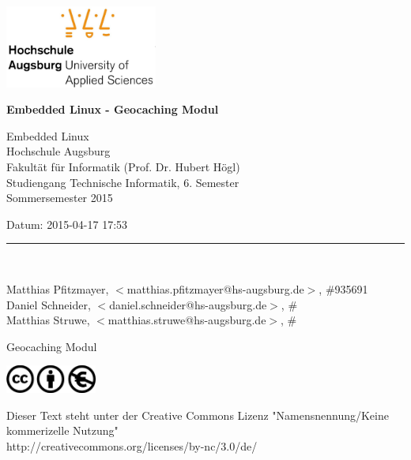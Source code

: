 




















\ \ 
\hfill
\begin{minipage}[t]{5cm}
\includegraphics[width=5cm]{img/hsa-logo.jpg}
\end{minipage}

\vskip 10mm

{\parindent=0pt

\thispagestyle{empty}


{\Large\bf Embedded Linux - Geocaching Modul
}

\vskip 5mm

Embedded Linux \\
Hochschule Augsburg \\
Fakultät für Informatik (Prof. Dr. Hubert Högl) \\
Studiengang Technische Informatik, 6. Semester \\

Sommersemester 2015
 

Datum: 2015-04-17 17:53 \\

\medskip

\rule{10cm}{4pt}\\

\medskip

Matthias Pfitzmayer, $<$matthias.pfitzmayer@hs-augsburg.de$>$, \#935691 \\
Daniel Schneider, $<$daniel.schneider@hs-augsburg.de$>$, \# \\
Matthias Struwe, $<$matthias.struwe@hs-augsburg.de$>$, \# \\


\vskip 2cm

\begin{center}
{\LARGE\bf

Geocaching Modul

}
\end{center}

\vfill

\begin{minipage}[t]{3cm}
\includegraphics[width=3cm]{img/cc-logo.jpg}
\end{minipage}

{\small
Dieser Text steht unter der Creative Commons Lizenz "Namensnennung/Keine kommerizelle Nutzung"\\
http://creativecommons.org/licenses/by-nc/3.0/de/
}

} %


\newpage
